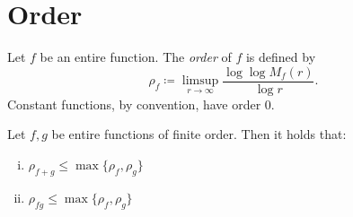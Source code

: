 \chapter{Order}
\label{ch:order}

\begin{definition} \label{def:order}
    Let $f$ be an entire function. The \emph{order} of $f$ is defined by
    \begin{equation} \label{eq:def-order}
        \rho_f \coloneqq \limsup_{r \to \infty} \frac{\log \log M_f(r)}{\log r}.
    \end{equation}
    Constant functions, by convention, have order 0.
\end{definition}

\begin{remark} \label{rem:order}

\end{remark}

\begin{proposition} \label{prop:algebraic-properties-order}
    Let $f, g$ be entire functions of finite order. Then it holds that:
    \begin{enumerate}[i.]
        \item $\rho_{f + g} \leq \max \{ \rho_f, \rho_g \}$
        \item $\rho_{f g} \leq \max \{ \rho_f, \rho_g \}$
    \end{enumerate}
\end{proposition}

